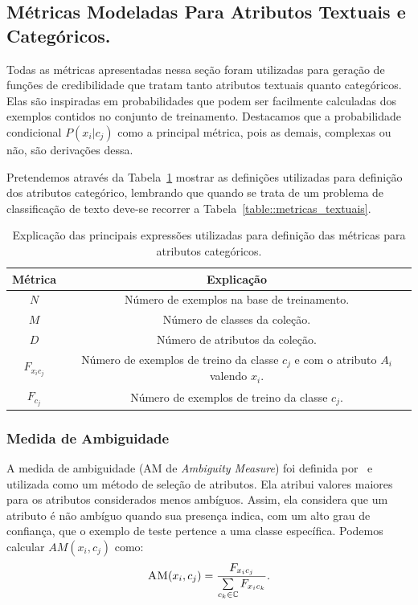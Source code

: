 %

\subsection{Métricas Modeladas Para Atributos Textuais e Categóricos.}
\label{subsec::pg_metricas_conteudo}


Todas as métricas apresentadas nessa seção foram utilizadas para geração de funções de credibilidade que tratam tanto atributos textuais quanto categóricos. 
Elas são inspiradas em probabilidades que podem ser facilmente calculadas dos exemplos contidos no conjunto de treinamento. 
Destacamos que a probabilidade condicional $P(x_i|c_j)$ como a principal métrica, pois as demais, complexas ou não, são derivações dessa.

Pretendemos através da Tabela~\ref{table::metricas_textuais_categoricos} mostrar as definições utilizadas para definição dos atributos categórico, lembrando que quando se trata de um problema de classificação de texto deve-se recorrer a Tabela~\ref{table::metricas_textuais}.


\begin{table}[ht*]
\centering
\begin{tabular}{|c|c|}
\toprule
    \textbf{Métrica} & \textbf{Explicação} \\
\midrule
    $N$           & Número de exemplos na base de treinamento. \tabularnewline \hline
    $M$           & Número de classes da coleção. \tabularnewline \hline
    $D$           & Número de atributos da coleção. \tabularnewline \hline
    $F_{x_ic_j}$  & Número de exemplos de treino da classe $c_j$ e com o atributo $A_i$ valendo $x_i$. \tabularnewline \hline
    $F_{c_j}$     & Número de exemplos de treino da classe $c_j$. \tabularnewline 
\bottomrule
\end{tabular}
\caption{Explicação das principais expressões utilizadas para definição das métricas para atributos categóricos.}
\label{table::metricas_textuais_categoricos}
\end{table}

\subsubsection{Medida de Ambiguidade} %
\label{subsubsection::am}

A medida de ambiguidade (\textsc{AM} de \textit{Ambiguity Measure}) foi definida por~\cite{Mengle08} e utilizada como um método de seleção de atributos. Ela atribui valores maiores para os atributos considerados menos ambíguos. Assim, ela considera que um atributo é não ambíguo quando sua presença indica, com um alto grau de confiança, que o exemplo de teste pertence a uma classe específica. Podemos calcular $AM(x_i, c_j)$ como:
\begin{equation}\label{eqn::am}
 \textsc{AM}(x_i, c_j) = \frac{ F_{x_{i}c_{j}}}{\sum\limits_{c_k \in \mathbb{C}} F_{x_{i}c_{k}}}.
\end{equation}

